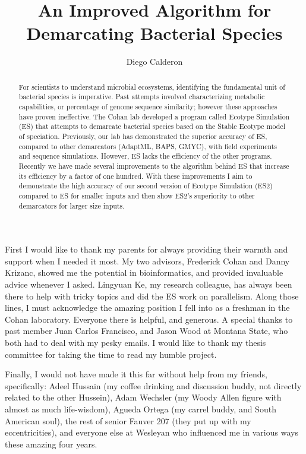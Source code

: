 \documentclass[11pt, final]{westhesis}
\title{An Improved Algorithm for Demarcating Bacterial Species}
\author{Diego Calderon}
\begin{document}

\begin{acknowledgements}
First I would like to thank my parents for always providing their warmth and support when I needed it most.
My two advisors, Frederick Cohan and Danny Krizanc, showed me the potential in bioinformatics, and provided invaluable advice whenever I asked.
Lingyuan Ke, my research colleague, has always been there to help with tricky topics and did the ES work on parallelism.
Along those lines, I must acknowledge the amazing position I fell into as a freshman in the Cohan laboratory.
Everyone there is helpful, and generous.
A special thanks to past member Juan Carlos Francisco, and Jason Wood at Montana State, who both had to deal with my pesky emails.
I would like to thank my thesis committee for taking the time to read my humble project.

Finally, I would not have made it this far without help from my friends, specifically: Adeel Hussain (my coffee drinking and discussion buddy, not directly related to the other Hussein), Adam Wechsler (my Woody Allen figure with almost as much life-wisdom), Agueda Ortega (my carrel buddy,  and South American soul), the rest of senior Fauver 207 (they put up with my eccentricities), and everyone else at Wesleyan who influenced me in various ways these amazing four years.
\end{acknowledgements}


\begin{abstract}
For scientists to understand microbial ecosystems, identifying the fundamental unit of bacterial species is imperative.
Past attempts involved characterizing metabolic capabilities, or percentage of genome sequence similarity; however these approaches have proven ineffective.
The Cohan lab developed a program called Ecotype Simulation (ES) that attempts to demarcate bacterial species based on the Stable Ecotype model of speciation.
Previously, our lab has demonstrated the superior accuracy of ES, compared to other demarcators (AdaptML, BAPS, GMYC), with field experiments and sequence simulations.
However, ES lacks the efficiency of the other programs.
Recently we have made several improvements to the algorithm behind ES that increase its efficiency by a factor of one hundred.
With these improvements I aim to demonstrate the high accuracy of our second version of Ecotype Simulation (ES2) compared to ES for smaller inputs and then show ES2's superiority to other demarcators for larger size inputs.
\end{abstract}
\end{document}
